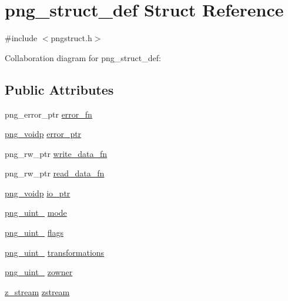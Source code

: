 \hypertarget{structpng__struct__def}{}\section{png\+\_\+struct\+\_\+def Struct Reference}
\label{structpng__struct__def}


{\ttfamily \#include $<$pngstruct.\+h$>$}



Collaboration diagram for png\+\_\+struct\+\_\+def\+:
\subsection*{Public Attributes}
\begin{DoxyCompactItemize}
\item 
png\+\_\+error\+\_\+ptr \hyperlink{structpng__struct__def_a2cc5bd1cf507373992a61cf725a730cd}{error\+\_\+fn}
\item 
\hyperlink{pngconf_8h_a9dc088c359b6d7e45682af63a3361b58}{png\+\_\+voidp} \hyperlink{structpng__struct__def_a06837611b772a6a44cf6306ea08d40a8}{error\+\_\+ptr}
\item 
png\+\_\+rw\+\_\+ptr \hyperlink{structpng__struct__def_acc53cd87f0ffc4d1f67da7e10a94af39}{write\+\_\+data\+\_\+fn}
\item 
png\+\_\+rw\+\_\+ptr \hyperlink{structpng__struct__def_a83804076437d1587fab947c056bb56ae}{read\+\_\+data\+\_\+fn}
\item 
\hyperlink{pngconf_8h_a9dc088c359b6d7e45682af63a3361b58}{png\+\_\+voidp} \hyperlink{structpng__struct__def_a996f6f8aaa00ede3bb147714ee7c480e}{io\+\_\+ptr}
\item 
\hyperlink{pngrutil_8c_a89824d0e9f0724e3e7799b01a2b5fe58}{png\+\_\+uint\+\_} \hyperlink{structpng__struct__def_a6db33193ca2fdb01fa6d8da9756bd448}{mode}
\item 
\hyperlink{pngrutil_8c_a89824d0e9f0724e3e7799b01a2b5fe58}{png\+\_\+uint\+\_} \hyperlink{structpng__struct__def_aa7529cc3d13e759037c504fddd6e1ae8}{flags}
\item 
\hyperlink{pngrutil_8c_a89824d0e9f0724e3e7799b01a2b5fe58}{png\+\_\+uint\+\_} \hyperlink{structpng__struct__def_a4ab3e33248dd4c32880609a1a10fa725}{transformations}
\item 
\hyperlink{pngrutil_8c_a89824d0e9f0724e3e7799b01a2b5fe58}{png\+\_\+uint\+\_} \hyperlink{structpng__struct__def_a5bfc727f45873680edacf4d12bebc8f4}{zowner}
\item 
\hyperlink{zlib_8h_afa60092f4e0b9bc4f23b41c6930463f0}{z\+\_\+stream} \hyperlink{structpng__struct__def_aed56a6997ce7d1a90f0a143eb0964cd5}{zstream}

\end{DoxyCompactItemize}
